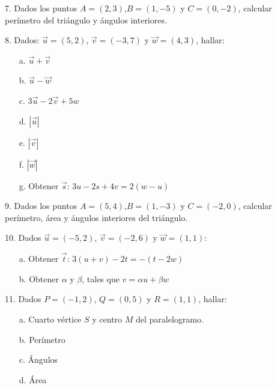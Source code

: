 \documentclass[aspectratio=1610,t, 10pt]{beamer}
\begin{document}
\begin{frame} 
7. Dados los puntos \(A = (2,3)\),\(B = (1,-5)\) y \(C = (0,-2)\),
calcular perímetro del triángulo y ángulos interiores.
\end{frame}

\begin{frame} 
8. Dados: \(\vec{u}=(5,2)\), \(\vec{v}=(-3,7)\) y \(\vec{w}=(4,3)\),
hallar:
\begin{itemize}
    \item[a.] \(\vec{u}+\vec{v}\)
    \item[b.] \(\vec{u}-\vec{w}\)
    \item[c.] \(3\vec{u}-2\vec{v}+5{w}\)
    \item[d.] \(|\vec{u}|\)
    \item[e.] \(|\vec{v}|\)
    \item[f.] \(|\vec{w}|\)
    \item[g.] Obtener \(\vec{s}\): \(3u-2s+4v=2(w-u)\)
\end{itemize}
\end{frame}

\begin{frame} 
9. Dados los puntos \(A = (5,4)\),\(B = (1,-3)\) y \(C = (-2,0)\),
calcular perímetro, área y ángulos interiores del triángulo.
\end{frame}

\begin{frame} 
10. Dados \(\vec{u}=(-5,2)\), \(\vec{v}=(-2,6)\) y \(\vec{w}=(1,1)\):
\begin{itemize}
    \item[a.] Obtener \(\vec{t}\): \(3(u+v) - 2t = -(t - 2w)\)
    \item[b.] Obtener \(\alpha\) y \(\beta\), tales que \(v = \alpha u + \beta w\)
\end{itemize}
\end{frame}

\begin{frame} 
11. Dados \(P = (-1,2)\), \(Q = (0,5)\) y \(R = (1,1)\), hallar:
\begin{itemize}
    \item[a.] Cuarto vértice \(S\) y centro \(M\) del paralelogramo.
    \item[b.] Perímetro
    \item[c.] Ángulos
    \item[d.] Área
\end{itemize}
\end{frame}
\end{document}
